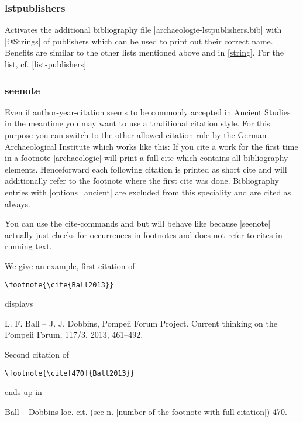 \documentclass[a4paper,
10pt,
greek,
french,
spanish,
italian,
ngerman,
english
]{ltxdoc}
\begin{document}
\subsubsection{lstpublishers}\label{lstpublishers}
Activates the additional bibliography file |archaeologie-lstpublishers.bib| with |@Strings| 
of publishers which can be used to print out their correct name. 
Benefits are similar to the other lists mentioned above and in \cref{string}.
For the list, cf. \cref{list-publishers}




\subsubsection{seenote}\label{seenote}
Even if author-year-citation seems to be commonly accepted in Ancient Studies in the meantime you may want to use a traditional citation style. 
For this purpose you can switch to the other allowed citation rule by the German Archaeological Institute
which works like this:
If you cite a work for the first time in a footnote |archaeologie| will print a full cite which contains all bibliography elements.
Henceforward each following citation is printed as short cite and will additionally refer to the footnote where the first cite was done.
Bibliography entries with |options={ancient}| are excluded from this speciality and are cited as always.

You can use the cite-commands  and  but  
will behave like  because |seenote| actually just checks for occurrences in footnotes and does not refer to cites in running text.

We give an example, first citation of 
\begin{lstlisting}
\footnote{\cite{Ball2013}}
\end{lstlisting}

displays

\begin{bsp}
L. F. Ball – J. J. Dobbins, Pompeii Forum Project. Current thinking on the Pompeii Forum, 117/3, 2013, 461–492.
\end{bsp}

Second citation of
\begin{lstlisting}
\footnote{\cite[470]{Ball2013}}
\end{lstlisting}

ends up in

\begin{bsp}
Ball – Dobbins loc. cit. (see n. [number of the footnote with full citation]) 470.
\end{bsp}
\end{document}
